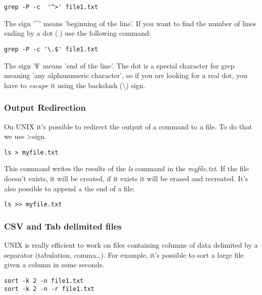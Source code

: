 \documentclass[two_sides]{my_article}
\begin{document}
\begin{lstlisting}[frame=lines, numbers=none]
grep -P -c  '^>' file1.txt
\end{lstlisting}

The sign '\textasciicircum' means 'beginning of the line'. If you want to find the number of lines ending by a dot (.) use the following command:

\begin{lstlisting}[frame=lines, numbers=none]
grep -P -c '\.$' file1.txt
\end{lstlisting}
The sign '\$' means 'end of the line'. The dot is a special character for grep meaning 'any alphanumeric character', so if you are looking for a real dot, you have to \emph{escape} it using the backslash (\textbackslash) sign.

\subsubsection{Output Redirection}

On UNIX it's possible to redirect the output of a command to a file. To do that we use \textgreater\space sign.

\begin{lstlisting}[frame=lines, numbers=none]
ls > myfile.txt
\end{lstlisting}

This command writes the results of the \emph{ls} command in the \emph{myfile.txt}. If the file doesn't exists, it will be created, if it exists it will be erased and recreated. It's also possible to append a the end of a file:

\begin{lstlisting}[frame=lines, numbers=none]
ls >> myfile.txt
\end{lstlisting}

\subsubsection{CSV and Tab delimited files}

UNIX is really efficient to work on files containing columns of data delimited by a separator (tabulation, comma\dots). For example, it's possible to sort a large file given a column in some seconds.

\begin{lstlisting}[frame=lines]
sort -k 2 -n file1.txt
sort -k 2 -n -r file1.txt
\end{lstlisting}
\end{document}
